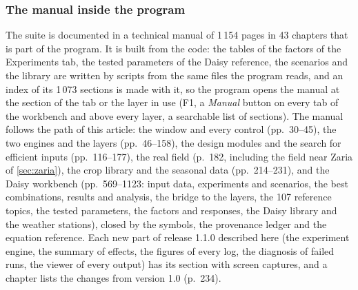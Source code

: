 \documentclass[preprint,12pt]{elsarticle}
\begin{document}
\subsubsection{The manual inside the program}\label{sec:manual3}
The suite is documented in a technical manual of 1\,154 pages in 43 chapters \cite{HaliluManual} that is part of the program. It is built from the code: the tables of the factors of the Experiments tab, the tested parameters of the Daisy reference, the scenarios and the library are written by scripts from the same files the program reads, and an index of its 1\,073 sections is made with it, so the program opens the manual at the section of the tab or the layer in use (F1, a \emph{Manual} button on every tab of the workbench and above every layer, a searchable list of sections). The manual follows the path of this article: the window and every control (pp.~30--45), the two engines and the layers (pp.~46--158), the design modules and the search for efficient inputs (pp.~116--177), the real field (p.~182, including the field near Zaria of \cref{sec:zaria}), the crop library and the seasonal data (pp.~214--231), and the Daisy workbench (pp.~569--1123: input data, experiments and scenarios, the best combinations, results and analysis, the bridge to the layers, the 107 reference topics, the tested parameters, the factors and responses, the Daisy library and the weather stations), closed by the symbols, the provenance ledger and the equation reference. Each new part of release 1.1.0 described here (the experiment engine, the summary of effects, the figures of every log, the diagnosis of failed runs, the viewer of every output) has its section with screen captures, and a chapter lists the changes from version 1.0 (p.~234).
\end{document}
